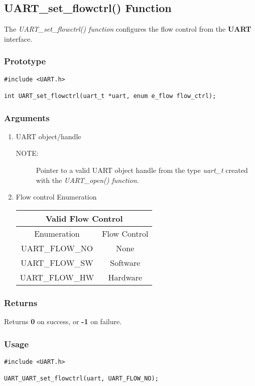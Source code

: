 \documentclass{report}
\begin{document}
\subsection{UART\_set\_flowctrl() Function}
The \textit{UART\_set\_flowctrl() function} configures the flow
control from the \textbf{UART} interface.
\subsubsection*{Prototype}
\begin{lstlisting}
#include <UART.h>

int UART_set_flowctrl(uart_t *uart, enum e_flow flow_ctrl);
\end{lstlisting}
\subsubsection*{Arguments}
\begin{enumerate}
\item UART object/handle
\begin{description}
\item[NOTE:] Pointer to a valid UART object handle from the type \textit{uart\_t}
created with the \textit{UART\_open() function}.
\end{description}
\item Flow control Enumeration
\newline
\newline
\begin{tabular}{| c | c |}
\hline
\multicolumn{2}{|c|}{Valid Flow Control} \\
\hline
Enumeration & Flow Control \\
\hline
UART\_FLOW\_NO & None \\
UART\_FLOW\_SW & Software \\
UART\_FLOW\_HW & Hardware \\
\hline
\end{tabular}
\end{enumerate}
\subsubsection*{Returns}
Returns \textbf{0} on success, or \textbf{-1} on failure.
\subsubsection*{Usage}
\begin{lstlisting}
#include <UART.h>

UART_UART_set_flowctrl(uart, UART_FLOW_NO);
\end{lstlisting}
\end{document}
